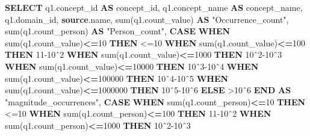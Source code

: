 \documentclass[
]{book}
\newenvironment{Shaded}{\begin{snugshade}}{\end{snugshade}}
\newcommand{\ControlFlowTok}[1]{\textcolor[rgb]{0.13,0.29,0.53}{\textbf{#1}}}
\newcommand{\DecValTok}[1]{\textcolor[rgb]{0.00,0.00,0.81}{#1}}
\newcommand{\FunctionTok}[1]{\textcolor[rgb]{0.00,0.00,0.00}{#1}}
\newcommand{\KeywordTok}[1]{\textcolor[rgb]{0.13,0.29,0.53}{\textbf{#1}}}
\newcommand{\NormalTok}[1]{#1}
\newcommand{\OperatorTok}[1]{\textcolor[rgb]{0.81,0.36,0.00}{\textbf{#1}}}
\newcommand{\OtherTok}[1]{\textcolor[rgb]{0.56,0.35,0.01}{#1}}
\newcommand{\StringTok}[1]{\textcolor[rgb]{0.31,0.60,0.02}{#1}}
\begin{document}
\begin{Shaded}
\begin{Highlighting}[]
\KeywordTok{SELECT}
\NormalTok{    q1.concept\_id }\KeywordTok{AS}\NormalTok{ concept\_id,}
\NormalTok{    q1.concept\_name }\KeywordTok{AS}\NormalTok{ concept\_name,}
\NormalTok{    q1.domain\_id,}
    \KeywordTok{source}\NormalTok{.name,}
    \FunctionTok{sum}\NormalTok{(q1.count\_value) }\KeywordTok{AS} \OtherTok{"Occurrence\_count"}\NormalTok{,}
    \FunctionTok{sum}\NormalTok{(q1.count\_person) }\KeywordTok{AS} \OtherTok{"Person\_count"}\NormalTok{,}
    \ControlFlowTok{CASE} 
        \ControlFlowTok{WHEN} \FunctionTok{sum}\NormalTok{(q1.count\_value)}\OperatorTok{\textless{}=}\DecValTok{10} \ControlFlowTok{THEN} \StringTok{\textquotesingle{}\textless{}=10\textquotesingle{}}
        \ControlFlowTok{WHEN} \FunctionTok{sum}\NormalTok{(q1.count\_value)}\OperatorTok{\textless{}=}\DecValTok{100} \ControlFlowTok{THEN} \StringTok{\textquotesingle{}11{-}10ˆ2\textquotesingle{}}
        \ControlFlowTok{WHEN} \FunctionTok{sum}\NormalTok{(q1.count\_value)}\OperatorTok{\textless{}=}\DecValTok{1000} \ControlFlowTok{THEN} \StringTok{\textquotesingle{}10ˆ2{-}10ˆ3\textquotesingle{}}
        \ControlFlowTok{WHEN} \FunctionTok{sum}\NormalTok{(q1.count\_value)}\OperatorTok{\textless{}=}\DecValTok{10000} \ControlFlowTok{THEN} \StringTok{\textquotesingle{}10ˆ3{-}10ˆ4\textquotesingle{}}
        \ControlFlowTok{WHEN} \FunctionTok{sum}\NormalTok{(q1.count\_value)}\OperatorTok{\textless{}=}\DecValTok{100000} \ControlFlowTok{THEN} \StringTok{\textquotesingle{}10ˆ4{-}10ˆ5\textquotesingle{}}
        \ControlFlowTok{WHEN} \FunctionTok{sum}\NormalTok{(q1.count\_value)}\OperatorTok{\textless{}=}\DecValTok{1000000} \ControlFlowTok{THEN} \StringTok{\textquotesingle{}10ˆ5{-}10ˆ6\textquotesingle{}}
        \ControlFlowTok{ELSE} \StringTok{\textquotesingle{}\textgreater{}10ˆ6\textquotesingle{}}
    \ControlFlowTok{END} \KeywordTok{AS} \OtherTok{"magnitude\_occurrences"}\NormalTok{,}
    \ControlFlowTok{CASE} 
        \ControlFlowTok{WHEN} \FunctionTok{sum}\NormalTok{(q1.count\_person)}\OperatorTok{\textless{}=}\DecValTok{10} \ControlFlowTok{THEN} \StringTok{\textquotesingle{}\textless{}=10\textquotesingle{}}
        \ControlFlowTok{WHEN} \FunctionTok{sum}\NormalTok{(q1.count\_person)}\OperatorTok{\textless{}=}\DecValTok{100} \ControlFlowTok{THEN} \StringTok{\textquotesingle{}11{-}10ˆ2\textquotesingle{}}
        \ControlFlowTok{WHEN} \FunctionTok{sum}\NormalTok{(q1.count\_person)}\OperatorTok{\textless{}=}\DecValTok{1000} \ControlFlowTok{THEN} \StringTok{\textquotesingle{}10ˆ2{-}10ˆ3\textquotesingle{}}

\end{Highlighting}
\end{Shaded}
\end{document}
